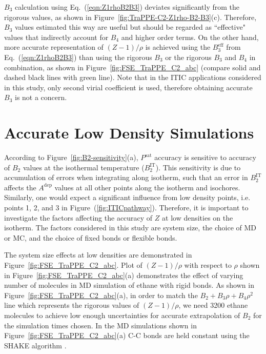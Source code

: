 \documentclass[5p,times]{elsarticle}
\begin{document}
$B_3$ calculation using Eq.~(\ref{eqn:Z1rhoB2B3}) deviates significantly from the rigorous values, as shown in Figure~\ref{fig:TraPPE-C2-Z1rho-B2-B3}(c). Therefore, $B_3$ values estimated this way are useful but should be regarded as ``effective" values that indirectly account for $B_4$ and higher order terms. On the other hand, more accurate representation of $(Z-1)/\rho$ is achieved using the $B_3^\mathrm{eff}$ from Eq.~(\ref{eqn:Z1rhoB2B3}) than using the rigorous $B_3$ or the rigorous $B_3$ and $B_4$ in combination, as shown in Figure~\ref{fig:FSE_TraPPE_C2_abc} (compare solid and dashed black lines with green line). Note that in the ITIC applications considered in this study, only second virial coefficient is used, therefore obtaining accurate $B_3$ is not a concern.


\section{Accurate Low Density Simulations}\label{sec:FSE}
According to Figure~\ref{fig:B2-sensitivity}(a), $P^{\mathrm{sat}}$ accuracy is sensitive to accuracy of $B_2$ values at the isothermal temperature ($B_2^{\mathrm{IT}}$). This sensitivity is due to accumulation of errors when integrating along isotherm, such that an error in $B_2^{\mathrm{IT}}$ affects the $A^{\mathrm{dep}}$ values at all other points along the isotherm and isochores. Similarly, one would expect a significant influence from low density points, i.e. points 1, 2, and 3 in Figure~(\ref{fig:ITICpathway}). Therefore, it is important to investigate the factors affecting the accuracy of $Z$ at low densities on the isotherm. The factors considered in this study are system size, the choice of MD or MC, and the choice of fixed bonds or flexible bonds. 

The system size effects at low densities are demonstrated in Figure~\ref{fig:FSE_TraPPE_C2_abc}. Plot of $(Z-1)/\rho$ with respect to $\rho$ shown in Figure~\ref{fig:FSE_TraPPE_C2_abc}(a) demonstrates the effect of varying number of molecules in MD simulation of ethane with rigid bonds. As shown in Figure~\ref{fig:FSE_TraPPE_C2_abc}(a), in order to match the $B_2+B_3 \rho+B_4 \rho^2$ line which represents the rigorous values of $(Z-1)/\rho$, we need 3200 ethane molecules to achieve low enough uncertainties for accurate extrapolation of $B_2$ for the simulation times chosen. In the MD simulations shown in Figure~\ref{fig:FSE_TraPPE_C2_abc}(a) C-C bonds are held constant using the SHAKE algorithm \cite{Ryckaert1977}. 
\end{document}
